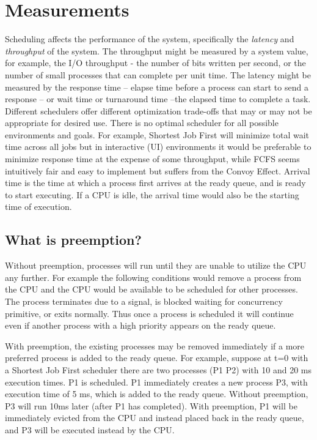 \section{Measurements}

Scheduling affects the performance of the system, specifically the \emph{latency} and \emph{throughput} of the system.
The throughput might be measured by a system value, for example, the I/O throughput - the number of bits written per second, or the number of small processes that can complete per unit time.
The latency might be measured by the response time -- elapse time before a process can start to send a response -- or wait time or turnaround time --the elapsed time to complete a task.
Different schedulers offer different optimization trade-offs that may or may not be appropriate for desired use.
There is no optimal scheduler for all possible environments and goals.
For example, Shortest Job First will minimize total wait time across all jobs but in interactive (UI) environments it would be preferable to minimize response time at the expense of some throughput, while FCFS seems intuitively fair and easy to implement but suffers from the Convoy Effect.
Arrival time is the time at which a process first arrives at the ready queue, and is ready to start executing.
If a CPU is idle, the arrival time would also be the starting time of execution.

\subsection{What is preemption?}

Without preemption, processes will run until they are unable to utilize the CPU any further.
For example the following conditions would remove a process from the CPU and the CPU would be available to be scheduled for other processes.
The process terminates due to a signal, is blocked waiting for concurrency primitive, or exits normally.
Thus once a process is scheduled it will continue even if another process with a high priority appears on the ready queue.

With preemption, the existing processes may be removed immediately if a more preferred process is added to the ready queue.
For example, suppose at t=0 with a Shortest Job First scheduler there are two processes (P1 P2) with 10 and 20 ms execution times.
P1 is scheduled.
P1 immediately creates a new process P3, with execution time of 5 ms, which is added to the ready queue.
Without preemption, P3 will run 10ms later (after P1 has completed).
With preemption, P1 will be immediately evicted from the CPU and instead placed back in the ready queue, and P3 will be executed instead by the CPU.

